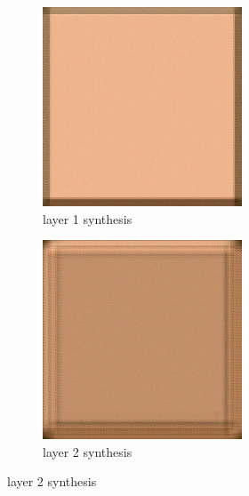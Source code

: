 \documentclass[11pt, oneside]{article}   	%
\begin{document}
\begin{figure}[H]
    \centering
    \begin{subfigure}[b]{0.45\textwidth}
        \includegraphics[width=\textwidth]{figure/stucco/layer_01_001}
        \caption{layer 1 synthesis}
    \end{subfigure}
    \begin{subfigure}[b]{0.45\textwidth}
        \includegraphics[width=\textwidth]{figure/stucco/layer_02_001}
        \caption{layer 2 synthesis}
    \end{subfigure}
    

\end{figure}
\end{document}
